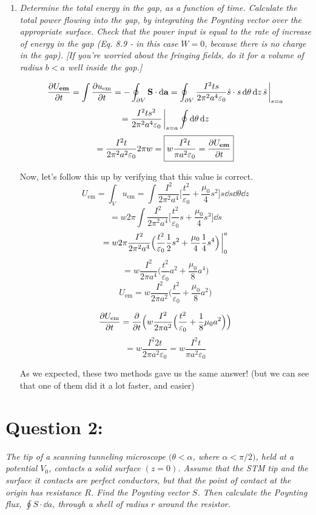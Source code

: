 \documentclass[12pt]{article}
\begin{document}
\begin{enumerate}[label=\alph*)]
\item \emph{Determine the total energy in the gap, as a function of time. Calculate the total power flowing into the gap, by integrating the Poynting vector over the appropriate surface. Check that the power input is equal to the rate of increase of energy in the gap (Eq. 8.9 - in this case $W=0$, because there is no charge in the gap). [If you're worried about the fringing fields, do it for a volume of radius $b<a$ well inside the gap.]}\bigskip

\[\pdv{U_\textbf{em}}{t} = \int \pdv{u_\text{em}}{t} = -\oint_{\partial V}\vb{S}\cdot \dd{\vb{a}} = \oint_{\partial V}\frac{I^2 t s}{2 \pi^2 a^4 \varepsilon_0} \hat{s} \cdot s \dd{\theta} \dd{z}\hat{s}\eval_{s=a}\]
\[= \frac{I^2 t s^2}{2 \pi^2 a^4 \varepsilon_0}\eval_{s=a} \oint \dd{\theta}\dd{z}\]
\[= \frac{I^2 t}{2 \pi^2 a^ 2 \varepsilon_0} 2\pi w = \boxed{w\frac{I^2 t}{\pi a^2 \varepsilon_0} = \pdv{U_\textbf{em}}{t}}\]

Now, let's follow this up by verifying that this value is correct. 
\[U_\text{em} = \int_V u_\text{em} = \int \frac{I^2}{2\pi^2 a^4}\Big[ \frac{t^2}{\varepsilon_0} + \frac{\mu_0}{4}s^2\Big]s \dd{s} \dd{\theta} \dd{z}\]
\[= w 2\pi \int \frac{I^2}{2\pi^2 a^4}\Big[ \frac{t^2}{\varepsilon_0}s + \frac{\mu_0}{4}s^3\Big] \dd{s}\]
\[= w2\pi \frac{I^2}{2\pi^2 a^4}\Big(\frac{t^2}{\varepsilon_0}\frac{1}{2}s^2 + \frac{\mu_0}{4}\frac{1}{4}s^4\Big)\eval_0^a\]
\[= w \frac{I^2}{2\pi a^4}\Big(\frac{t^2}{\varepsilon_0}a^2 + \frac{\mu_0}{8}a^4\Big)\]
\[U_\text{em} = w \frac{I^2}{2\pi a^2}\Big(\frac{t^2}{\varepsilon_0} + \frac{\mu_0}{8}a^2\Big)\]

\[\pdv{U_\text{em}}{t} = \pdv{t}\Big(w\frac{I^2}{2 \pi a^2}\Big(\frac{t^2}{\varepsilon_0} + \frac{1}{8}\mu_0 a^2\Big)\Big)\]
\[=w\frac{I^2 2t}{2\pi a^2 \varepsilon_0} = w\frac{I^2 t}{\pi a^2 \varepsilon_0}\]

As we expected, these two methods gave us the same answer! (but we can see that one of them did it a lot faster, and easier)

\end{enumerate}

\section*{Question 2:}
\emph{The tip of a scanning tunneling microscope $(\theta < \alpha$, where $\alpha < \pi/2)$, held at a potential $V_0$, contacts a solid surface $(z=0)$. Assume that the STM tip and the surface it contacts are perfect conductors, but that the point of contact at the origin has resistance $R$. Find the Poynting vector $S$. Then calculate the Poynting flux, $\oint S\cdot \dd{a}$, through a shell of radius $r$ around the resistor.}\bigskip
\end{document}
